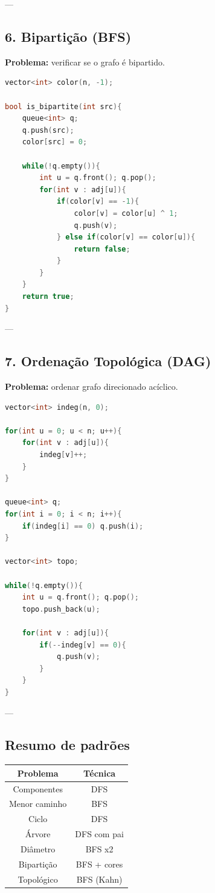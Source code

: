 \documentclass[11pt]{article}
\begin{document}
---

\subsection{6. Bipartição (BFS)}

\textbf{Problema:} verificar se o grafo é bipartido.

\begin{lstlisting}[language=C++]
vector<int> color(n, -1);

bool is_bipartite(int src){
    queue<int> q;
    q.push(src);
    color[src] = 0;

    while(!q.empty()){
        int u = q.front(); q.pop();
        for(int v : adj[u]){
            if(color[v] == -1){
                color[v] = color[u] ^ 1;
                q.push(v);
            } else if(color[v] == color[u]){
                return false;
            }
        }
    }
    return true;
}
\end{lstlisting}

---

\subsection{7. Ordenação Topológica (DAG)}

\textbf{Problema:} ordenar grafo direcionado acíclico.

\begin{lstlisting}[language=C++]
vector<int> indeg(n, 0);

for(int u = 0; u < n; u++){
    for(int v : adj[u]){
        indeg[v]++;
    }
}

queue<int> q;
for(int i = 0; i < n; i++){
    if(indeg[i] == 0) q.push(i);
}

vector<int> topo;

while(!q.empty()){
    int u = q.front(); q.pop();
    topo.push_back(u);

    for(int v : adj[u]){
        if(--indeg[v] == 0){
            q.push(v);
        }
    }
}
\end{lstlisting}

---

\subsection{Resumo de padrões}

\begin{center}
\begin{tabular}{|c|c|}
\hline
Problema & Técnica \\
\hline
Componentes & DFS \\
Menor caminho & BFS \\
Ciclo & DFS \\
Árvore & DFS com pai \\
Diâmetro & BFS x2 \\
Bipartição & BFS + cores \\
Topológico & BFS (Kahn) \\
\hline
\end{tabular}
\end{center}
\end{document}
